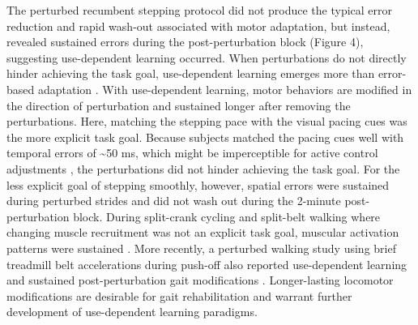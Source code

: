 \documentclass[shortpaper,twoside,web]{ieeecolor}
\newcommand{\td}{\textasciitilde}
\begin{document}
The perturbed recumbent stepping protocol did not produce the typical error reduction and rapid wash-out associated with motor adaptation, but instead, revealed sustained errors during the post-perturbation block (Figure 4), suggesting use-dependent learning occurred. When perturbations do not directly hinder achieving the task goal, use-dependent learning emerges more than error-based adaptation \cite{Diedrichsen2010-as}. With use-dependent learning, motor behaviors are modified in the direction of perturbation and sustained longer after removing the perturbations. Here, matching the stepping pace with the visual pacing cues was the more explicit task goal. Because subjects matched the pacing cues well with temporal errors of \td50 ms, which might be imperceptible for active control adjustments \cite{Carpenter1999-lb}, the perturbations did not hinder achieving the task goal. For the less explicit goal of stepping smoothly, however, spatial errors were sustained during perturbed strides and did not wash out during the 2-minute post-perturbation block. During split-crank cycling and split-belt walking where changing muscle recruitment was not an explicit task goal, muscular activation patterns were sustained  \cite{Alibiglou2011-sc,Maclellan2014-vk}. More recently, a perturbed walking study using brief treadmill belt accelerations during push-off also reported use-dependent learning and sustained post-perturbation gait modifications \cite{Farrens2020-fb}. Longer-lasting locomotor modifications are desirable for gait rehabilitation and warrant further development of use-dependent learning paradigms.
\end{document}
